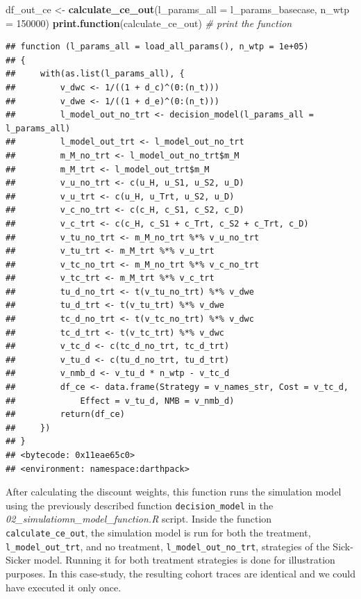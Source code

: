 \documentclass[
]{book}
\newenvironment{Shaded}{\begin{snugshade}}{\end{snugshade}}
\newcommand{\AttributeTok}[1]{\textcolor[rgb]{0.13,0.29,0.53}{#1}}
\newcommand{\CommentTok}[1]{\textcolor[rgb]{0.56,0.35,0.01}{\textit{#1}}}
\newcommand{\DecValTok}[1]{\textcolor[rgb]{0.00,0.00,0.81}{#1}}
\newcommand{\FunctionTok}[1]{\textcolor[rgb]{0.13,0.29,0.53}{\textbf{#1}}}
\newcommand{\NormalTok}[1]{#1}
\newcommand{\OtherTok}[1]{\textcolor[rgb]{0.56,0.35,0.01}{#1}}
\begin{document}
\begin{Shaded}
\begin{Highlighting}[]
\NormalTok{df\_out\_ce }\OtherTok{\textless{}{-}} \FunctionTok{calculate\_ce\_out}\NormalTok{(}\AttributeTok{l\_params\_all =}\NormalTok{ l\_params\_basecase, }
                                \AttributeTok{n\_wtp =} \DecValTok{150000}\NormalTok{)}
\FunctionTok{print.function}\NormalTok{(calculate\_ce\_out) }\CommentTok{\# print the function}
\end{Highlighting}
\end{Shaded}

\begin{verbatim}
## function (l_params_all = load_all_params(), n_wtp = 1e+05) 
## {
##     with(as.list(l_params_all), {
##         v_dwc <- 1/((1 + d_c)^(0:(n_t)))
##         v_dwe <- 1/((1 + d_e)^(0:(n_t)))
##         l_model_out_no_trt <- decision_model(l_params_all = l_params_all)
##         l_model_out_trt <- l_model_out_no_trt
##         m_M_no_trt <- l_model_out_no_trt$m_M
##         m_M_trt <- l_model_out_trt$m_M
##         v_u_no_trt <- c(u_H, u_S1, u_S2, u_D)
##         v_u_trt <- c(u_H, u_Trt, u_S2, u_D)
##         v_c_no_trt <- c(c_H, c_S1, c_S2, c_D)
##         v_c_trt <- c(c_H, c_S1 + c_Trt, c_S2 + c_Trt, c_D)
##         v_tu_no_trt <- m_M_no_trt %*% v_u_no_trt
##         v_tu_trt <- m_M_trt %*% v_u_trt
##         v_tc_no_trt <- m_M_no_trt %*% v_c_no_trt
##         v_tc_trt <- m_M_trt %*% v_c_trt
##         tu_d_no_trt <- t(v_tu_no_trt) %*% v_dwe
##         tu_d_trt <- t(v_tu_trt) %*% v_dwe
##         tc_d_no_trt <- t(v_tc_no_trt) %*% v_dwc
##         tc_d_trt <- t(v_tc_trt) %*% v_dwc
##         v_tc_d <- c(tc_d_no_trt, tc_d_trt)
##         v_tu_d <- c(tu_d_no_trt, tu_d_trt)
##         v_nmb_d <- v_tu_d * n_wtp - v_tc_d
##         df_ce <- data.frame(Strategy = v_names_str, Cost = v_tc_d, 
##             Effect = v_tu_d, NMB = v_nmb_d)
##         return(df_ce)
##     })
## }
## <bytecode: 0x11eae65c0>
## <environment: namespace:darthpack>
\end{verbatim}

After calculating the discount weights, this function runs the simulation model using the previously described function \texttt{decision\_model} in the \emph{02\_simulatiomn\_model\_function.R} script. Inside the function \texttt{calculate\_ce\_out}, the simulation model is run for both the treatment, \texttt{l\_model\_out\_trt}, and no treatment, \texttt{l\_model\_out\_no\_trt}, strategies of the Sick-Sicker model. Running it for both treatment strategies is done for illustration purposes. In this case-study, the resulting cohort traces are identical and we could have executed it only once.
\end{document}
